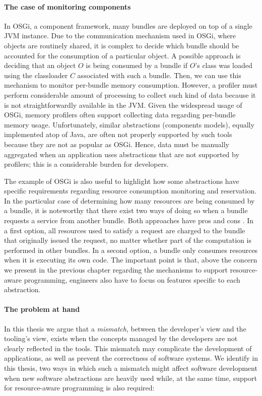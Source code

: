 \paragraph{The case of monitoring components}
In OSGi, a component framework, many bundles are deployed on top of a single JVM instance.
Due to the communication mechanism used in OSGi, where objects are routinely shared, it is complex to decide which bundle should be accounted for the consumption of a particular object.
A possible approach is deciding that an object $O$ is being consumed by a bundle if $O$'s class was loaded using the classloader $C$ associated with such a bundle.
Then, we can use this mechanism to monitor per-bundle memory consumption. 
However, a profiler must perform considerable amount of processing to collect such kind of data because it is not straightforwardly available in the JVM. 
Given the widespread usage of OSGi, memory profilers often support collecting data regarding per-bundle memory usage.
Unfortunately, similar abstractions (components models), equally implemented atop of Java, are often not properly supported by such tools because they are not as popular as OSGi.
Hence, data must be manually aggregated when an application uses abstractions that are not supported by profilers; this is a considerable burden for developers.

The example of OSGi is also useful to highlight how some abstractions have specific requirements regarding resource consumption monitoring and reservation.
In the particular case of determining how many resources are being consumed by a bundle, it is noteworthy that there exist two ways of doing so when a bundle requests a service from another bundle.
Both approaches have pros and cons \cite{Miettinen2008,Maurel:2012:AME:2304736.2304763}.
In a first option, all resources used to satisfy a request are charged to the bundle that originally issued the request, no matter whether part of the computation is performed in other bundles.
In a second option, a bundle only consumes resources when it is executing its own code.
The important point is that, above the concern we present in the previous chapter regarding the mechanisms to support resource-aware programming, engineers also have to focus on features specific to each abstraction.

\paragraph{The problem at hand}
In this thesis we argue that a \textit{mismatch}, between the developer's view and the tooling's view, exists when the concepts managed by the developers are not clearly reflected in the tools.
This mismatch may complicate the development of applications, as well as prevent the correctness of software systems.
We identify in this thesis, two ways in which such a mismatch might affect software development when new software abstractions are heavily used while, at the same time, support for resource-aware programming is also required:

